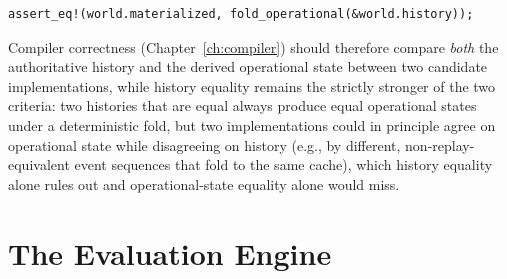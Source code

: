 \documentclass[12pt, a4paper, openany]{book}
\theoremstyle{plain}
\theoremstyle{definition}
\theoremstyle{remark}
\begin{document}
\begin{lstlisting}[style=rust, caption={Replay test for operational state}]
assert_eq!(world.materialized, fold_operational(&world.history));
\end{lstlisting}

Compiler correctness (Chapter~\ref{ch:compiler}) should therefore compare
\emph{both} the authoritative history and the derived operational state
between two candidate implementations, while history equality remains the
strictly stronger of the two criteria: two histories that are equal always
produce equal operational states under a deterministic fold, but two
implementations could in principle agree on operational state while disagreeing
on history (e.g., by different, non-replay-equivalent event sequences that fold
to the same cache), which history equality alone rules out and operational-state
equality alone would miss.

\section{The Evaluation Engine}
\end{document}
